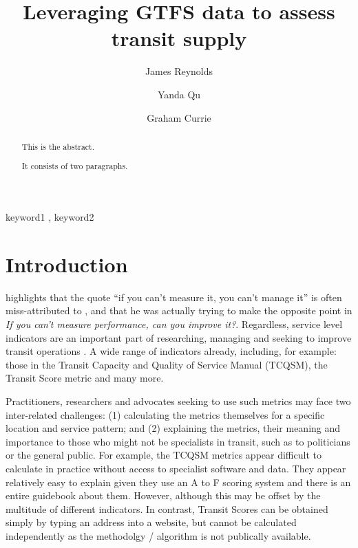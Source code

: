 \documentclass[preprint, 3p,
authoryear]{elsarticle} %
\begin{document}
\begin{frontmatter}

  \title{Leveraging GTFS data to assess transit supply}
    \author[Public Transport Research Group (PTRG)]{James Reynolds%
  }
    \author[Public Transport Research Group (PTRG)]{Yanda Qu%
  }
    \author[Public Transport Research Group (PTRG)]{Graham Currie%
  }
  
  \begin{abstract}
  This is the abstract.

  It consists of two paragraphs.
  \end{abstract}
    \begin{keyword}
    keyword1 \sep 
    keyword2
  \end{keyword}
  
 \end{frontmatter}

\hypertarget{introduction}{%
\section{Introduction}\label{introduction}}

\citet{Berenson2016} highlights that the quote ``if you can't measure
it, you can't manage it'' is often miss-attributed to
\citet{Deming1993new}, and that he was actually trying to make the
opposite point in \emph{If you can't measure performance, can you
improve it?}. Regardless, service level indicators are an important part
of researching, managing and seeking to improve transit operations
\citep{FieldingGordonJ1987Mpts, Ryus:2003aa}. A wide range of indicators
already, including, for example: those in the Transit Capacity and
Quality of Service Manual (TCQSM)\citep{TCQSM:2013}, the Transit Score
metric \citep{WalkScore:2023tg} and many more.

Practitioners, researchers and advocates seeking to use such metrics may
face two inter-related challenges: (1) calculating the metrics
themselves for a specific location and service pattern; and (2)
explaining the metrics, their meaning and importance to those who might
not be specialists in transit, such as to politicians or the general
public. For example, the TCQSM metrics appear difficult to calculate in
practice without access to specialist software and data. They appear
relatively easy to explain given they use an A to F scoring system and
there is an entire guidebook about them. However, although this may be
offset by the multitude of different indicators. In contrast, Transit
Scores can be obtained simply by typing an address into a website, but
cannot be calculated independently as the methodolgy / algorithm is not
publically available.
\end{document}
